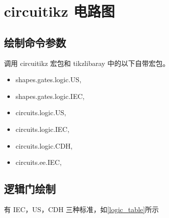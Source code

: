 \normalsize



\section{circuitikz 电路图}
\tikzexternaldisable
\subsection{绘制命令参数}

调用 circuitikz 宏包和 tikzlibaray 中的以下自带宏包。
\begin{itemize}
  \item shapes.gates.logic.US,
  \item shapes.gates.logic.IEC,
  \item circuits.logic.US,
  \item circuits.logic.IEC,
  \item circuits.logic.CDH,
  \item circuits.ee.IEC,
\end{itemize}


\subsection{逻辑门绘制}
有 IEC，US，CDH 三种标准，如\ref{logic_table}所示
\newcommand{\gateexamples}[1]{%
  #1 &
  \tikz[baseline,circuit logic IEC] \node[#1,label=] {}; &
  \tikz[baseline,circuit logic US]  \node[#1] {}; &
  \tikz[baseline,circuit logic CDH] \node[#1] {};
}

